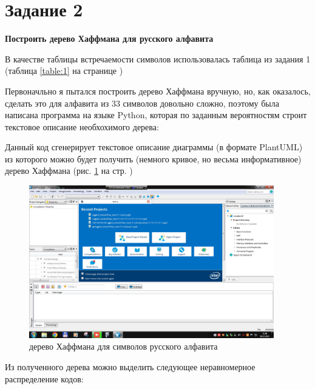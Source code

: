 \documentclass[a4paper,12pt]{article}
\begin{document}
  \section*{Задание 2}

  \textbf{Построить дерево Хаффмана для русского алфавита}

  В качестве таблицы встречаемости символов использовалась таблица из задания 1
  (таблица \ref{table:1} на странице \pageref{table:1})

  Первоначльно я пытался построить дерево Хаффмана вручную, но, как оказалось, сделать
  это для алфавита из 33 символов довольно сложно, поэтому была написана программа
  на языке Python, которая по заданным вероятностям строит текстовое описание необхохимого дерева:

  
  Данный код сгенерирует текстовое описание диаграммы (в формате PlantUML) из которого
  можно будет получить (немного кривое, но весьма информативное) дерево Хаффмана (рис.
  \ref{img:huffman} на стр. \pageref{img:huffman}) 

  \begin{figure}[p]
    \centering
    \includegraphics[width=0.95\textwidth]{02_01}
    \caption{дерево Хаффмана для символов русского алфавита}
    \label{img:huffman}
  \end{figure}

  Из полученного дерева можно выделить следующее неравномерное распределение кодов:
\end{document}
